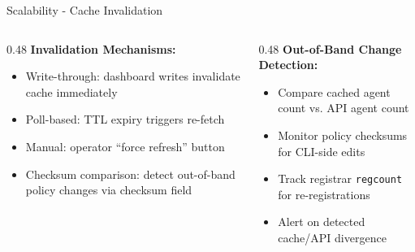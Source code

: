 \begin{frame}{Scalability - Cache Invalidation}
  \begin{columns}[T]
    \begin{column}{0.48\textwidth}
      \textbf{Invalidation Mechanisms:}
      \scriptsize
      \begin{itemize}
        \item Write-through: dashboard writes invalidate cache immediately
        \item Poll-based: TTL expiry triggers re-fetch
        \item Manual: operator ``force refresh'' button
        \item Checksum comparison: detect out-of-band policy changes via checksum field
      \end{itemize}
    \end{column}
    \begin{column}{0.48\textwidth}
      \textbf{Out-of-Band Change Detection:}
      \scriptsize
      \begin{itemize}
        \item Compare cached agent count vs. API agent count
        \item Monitor policy checksums for CLI-side edits
        \item Track registrar \texttt{regcount} for re-registrations
        \item Alert on detected cache/API divergence
      \end{itemize}
    \end{column}
  \end{columns}
\end{frame}

